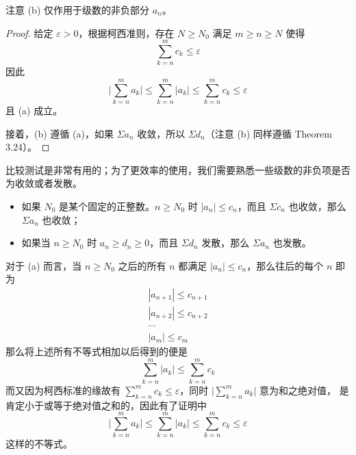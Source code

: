\documentclass[../poma-notes.tex]{subfiles}
\begin{document}
注意 (b) 仅作用于级数的非负部分 $a_n$。

\begin{proof}
  给定 $\varepsilon > 0$，根据柯西准则，存在 $N \ge N_0$ 满足 $m \ge n \ge N$ 使得
  \[ \sum_{k=n}^{m} c_k \le \varepsilon \]
  因此
  \[ \Bigg| \sum_{k=n}^{m} a_k \Bigg| \le \sum_{k=n}^{m} |a_k| \le \sum_{k=n}^{m} c_k \le \varepsilon \]
  且 (a) 成立。

  接着，(b) 遵循 (a)，如果 $\Sigma a_n$ 收敛，所以 $\Sigma d_n$（注意 (b) 同样遵循 Theorem 3.24）。
\end{proof}

比较测试是非常有用的；为了更效率的使用，我们需要熟悉一些级数的非负项是否为收敛或者发散。

\begin{anote}\mbox{}\par
  \begin{itemize}
    \item 如果 $N_0$ 是某个固定的正整数。$n \ge N_0$ 时 $|a_n| \le c_n$，而且 $\Sigma c_n$ 也收敛，那么 $\Sigma a_n$ 也收敛；
    \item 如果当 $n \ge N_0$ 时 $a_n \ge d_n \ge 0$，而且 $\Sigma d_n$ 发散，那么 $\Sigma a_n$ 也发散。
  \end{itemize}

  对于 (a) 而言，当 $n \ge N_0$ 之后的所有 $n$ 都满足 $|a_n| \le c_n$，那么往后的每个 $n$ 即为
  \begin{gather*}
    |a_{n+1}| \le c_{n+1} \\
    |a_{n+2}| \le c_{n+2} \\
    \cdots \\
    |a_{m}| \le c_{m}
  \end{gather*}
  那么将上述所有不等式相加以后得到的便是
  \[ \sum_{k=n}^{m} |a_k| \le \sum_{k=n}^{m} c_k \]
  而又因为柯西标准的缘故有 $\sum_{k=n}^{m} c_k \le \varepsilon$，同时 $\Bigg| \sum_{k=n}^{m} a_k \Bigg|$ 意为和之绝对值，
  是肯定小于或等于绝对值之和的，因此有了证明中
  \[ \Bigg| \sum_{k=n}^{m} a_k \Bigg| \le \sum_{k=n}^{m} |a_k| \le \sum_{k=n}^{m} c_k \le \varepsilon \]
  这样的不等式。
\end{anote}
\end{document}
